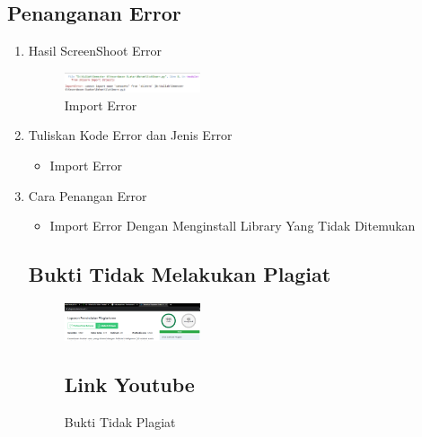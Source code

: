 \begin{enumerate}
\subsection{Penanganan Error}
\begin{enumerate}
	\item Hasil ScreenShoot Error
	\begin{figure}[H]
		\includegraphics[width=4cm]{figures/1174062/Error/Error 1.PNG}
		\centering
		\caption{Import Error}
	\end{figure}
	\item Tuliskan Kode Error dan Jenis Error
	\begin{itemize}
		\item Import Error
	\end{itemize}
	\item Cara Penangan Error
	\begin{itemize}
		\item Import Error
		\hfill\break
		Dengan Menginstall Library Yang Tidak Ditemukan
	\end{itemize}
	
\subsection{Bukti Tidak Melakukan Plagiat}
\begin{figure}[H]
	\includegraphics[width=4cm]{figures/1174062/Plagiat/plagiarisme.PNG}
	\centering
	\caption{Bukti Tidak Plagiat }
	
\subsection{Link Youtube}

\end{figure}
\end{enumerate}
\end{enumerate}

